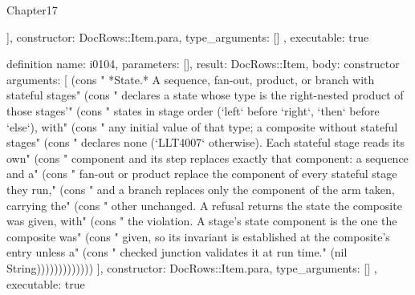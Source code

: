 \begin{lexlean}{Chapter17}
\begin{semanticmodule}
{{    ],
    constructor: DocRows::Item.para,
    type_arguments: []
  },
  executable: true
}

definition{
  name: i0104,
  parameters: [],
  result: DocRows::Item,
  body: constructor{
    arguments: [
      (cons "   *State.* A sequence, fan-out, product, or branch with stateful stages" (cons "   declares a state whose type is the right-nested product of those stages'" (cons "   states in stage order (`left` before `right`, `then` before `else`), with" (cons "   any initial value of that type; a composite without stateful stages" (cons "   declares none (`LLT4007` otherwise). Each stateful stage reads its own" (cons "   component and its step replaces exactly that component: a sequence and a" (cons "   fan-out or product replace the component of every stateful stage they run," (cons "   and a branch replaces only the component of the arm taken, carrying the" (cons "   other unchanged. A refusal returns the state the composite was given, with" (cons "   the violation. A stage's state component is the one the composite was" (cons "   given, so its invariant is established at the composite's entry unless a" (cons "   checked junction validates it at run time." (nil String)))))))))))))
    ],
    constructor: DocRows::Item.para,
    type_arguments: []
  },
  executable: true
}


\end{semanticmodule}
\end{lexlean}
